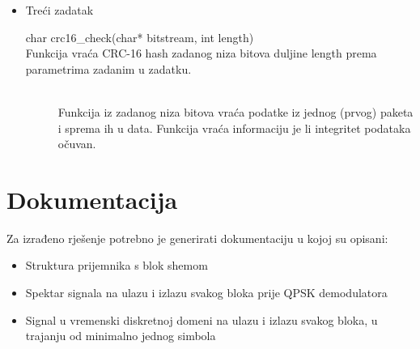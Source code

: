 \documentclass[a4paper]{article}
\begin{document}
\begin{itemize}
\begin{description}
	\end{description}
\item Treći zadatak
	\begin{description}
		\item[char crc16\_check(char* bitstream, int length)
		\,\\ Funkcija vraća CRC-16 hash zadanog niza bitova duljine length prema parametrima zadanim u zadatku.
		\item[bool frame\_decoder(char** bitstream, char** data)]
		\,\\ Funkcija iz zadanog niza bitova vraća podatke iz jednog (prvog) paketa i sprema ih u data. Funkcija vraća informaciju je li integritet podataka očuvan.
	\end{description}
\end{itemize}

\section{Dokumentacija}

Za izrađeno rješenje potrebno je generirati dokumentaciju u kojoj su opisani:
\begin{itemize}
\item Struktura prijemnika s blok shemom
\item Spektar signala na ulazu i izlazu svakog bloka prije QPSK demodulatora
\item Signal u vremenski diskretnoj domeni na ulazu i izlazu svakog bloka, u trajanju od minimalno jednog simbola
\end{itemize}
\end{document}
